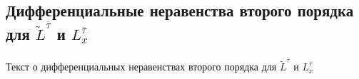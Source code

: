 \subsection{\texorpdfstring{Дифференциальные неравенства второго порядка для $\tilde{L}^{\overline{\tau}}$ и $L^{\overline{\tau}}_{x}$}{Дифференциальные неравенства второго порядка для Lτ и Lτx}}
Текст о дифференциальных неравенствах второго порядка для $\tilde{L}^{\overline{\tau}}$ и $L^{\overline{\tau}}_{x}$